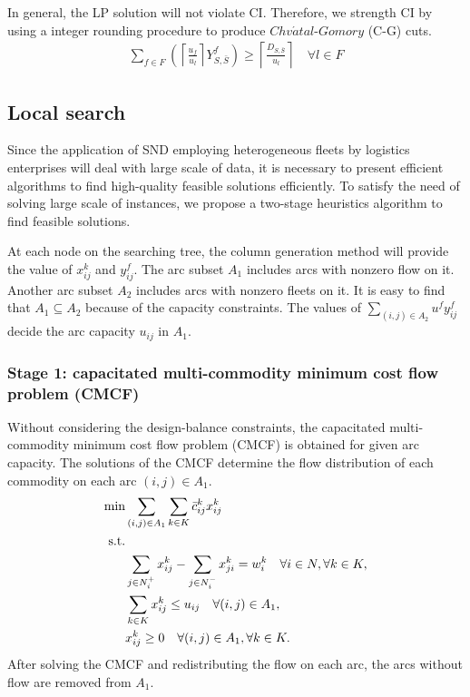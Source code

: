 \documentclass[11pt,nonblindrev,fleqn]{article}
\begin{document}
In general, the LP solution will not violate CI. Therefore, we strength CI by using a integer rounding procedure to produce $Chv\acute{a}tal$-$Gomory$ (C-G) cuts.
\begin{align}
  \sum_{f\in F} \left( \left \lceil \frac{u_f}{u_l} \right \rceil Y_{S,\bar{S}}^f  \right)  \geq \left\lceil \frac{D_{S,\bar{S}}}{u_l} \right\rceil  \quad   \forall l\in F
\end{align}
\subsection{Local search}
Since the application of SND employing heterogeneous fleets by logistics enterprises will deal with large scale of data, it is necessary to present efficient algorithms to find high-quality feasible solutions efficiently. To satisfy the need of solving large scale of instances, we propose a two-stage heuristics algorithm to find feasible solutions.

At each node on the searching tree, the column generation method will provide the value of $x_{ij}^k$ and $y_{ij}^f$. The arc subset $A_1$ includes arcs with nonzero flow on it. Another arc subset $A_2$ includes arcs with nonzero fleets on it. It is easy to find that $A_1\subseteq A_2$ because of the capacity constraints. The values of $\sum_{(i,j)\in A_2}u^f y_{ij}^f $ decide the arc capacity $u_{ij}$ in $A_1$.

\subsubsection{Stage 1: capacitated multi-commodity minimum cost flow problem (CMCF)}
Without considering the design-balance constraints, the capacitated multi-commodity minimum cost flow problem (CMCF) is obtained for given arc capacity. The solutions of the CMCF  determine the flow distribution of each commodity on each arc $(i,j)\in A_1$.
\begin{align}
   \min& \sum_{(i,j)\in A_1}\sum_{k\in K} \bar{c}_{ij}^k x_{ij}^k     \\
   \rm{s.t.} & \nonumber \\
         &  \sum_{j\in N_i^+}x_{ij}^k - \sum_{j\in N_i^-}x_{ji}^k = w_i^k     \quad      \forall i\in N, \forall k\in K,  \\
         &  \sum_{k\in K} x_{ij}^k \leq u_{ij}      \quad    \forall (i,j)\in A_1,  \\
        &  x_{ij}^k \geq 0   \quad    \forall (i,j)\in A_1, \forall k\in K.
\end{align}
After solving the CMCF and redistributing the flow on each arc, the arcs without flow are removed from $A_1$.
\end{document}
